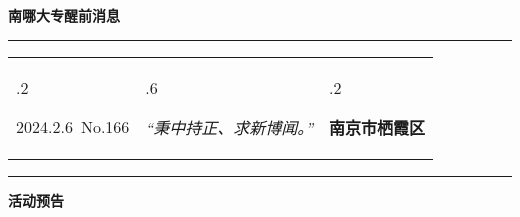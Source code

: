 \documentclass[letterpaper, 12pt]{article}
\begin{document}
\begin{center}
    \Huge\textbf{南哪大专醒前消息}
\end{center}
\vspace{4mm}
\hrule
\renewcommand\tabularxcolumn[1]{m{#1}}
\begin{tabularx}{\textwidth}{>{\hsize.2\hsize}X>{\hsize.6\hsize}X>{\hsize.2\hsize}X}
    \begin{flushleft}
        2024.2.6\, No.166
    \end{flushleft}
    &
    \begin{center}
        \textit{“秉中持正、求新博闻。”}
    \end{center}
    &
    \begin{flushright}
        \textbf{南京市栖霞区}
    \end{flushright}
\end{tabularx}
\vspace{-3.5mm}
\hrule
\vspace{4mm}
\centerline{\huge\textbf{活动预告}}
\end{document}
